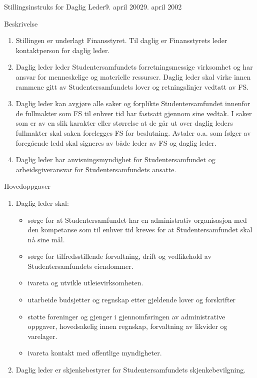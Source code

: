 \begin{instruks}{Stillingsinstruks for Daglig Leder}{9. april 2002}{9. april 2002}
    \begin{instruksledd}{Beskrivelse}
        \begin{enumerate}
            \item Stillingen er underlagt Finansstyret. Til daglig er Finansstyrets leder kontaktperson for daglig leder.
            \item Daglig leder leder Studentersamfundets forretningsmessige virksomhet og har ansvar for menneskelige og materielle
                ressurser. Daglig leder skal virke innen rammene gitt av Studentersamfundets lover og retningslinjer vedtatt av FS.
            \item Daglig leder kan avgjøre alle saker og forplikte Studentersamfundet innenfor de fullmakter som FS til enhver tid har
                fastsatt gjennom sine vedtak. I saker som er av en slik karakter eller størrelse at de går ut over daglig leders
                fullmakter skal saken forelegges FS for beslutning. Avtaler o.a. som følger av foregående ledd skal signeres
                av både leder av FS og daglig leder.
            \item Daglig leder har anvisningsmyndighet for Studentersamfundet og arbeidsgiveransvar for Studentersamfundets ansatte.
        \end{enumerate}
    \end{instruksledd}

    \begin{instruksledd}{Hovedoppgaver}
        \begin{enumerate}
            \item Daglig leder skal:
                \begin{itemize}
                    \item sørge for at Studentersamfundet har en administrativ organisasjon med den kompetanse som til
                        enhver tid kreves for at Studentersamfundet skal nå sine mål.
                    \item sørge for tilfredsstillende forvaltning, drift og vedlikehold av Studentersamfundets eiendommer.
                    \item ivareta og utvikle utleievirksomheten.
                    \item utarbeide budsjetter og regnskap etter gjeldende lover og forskrifter
                    \item støtte foreninger og gjenger i gjennomføringen av administrative oppgaver, hovedsakelig innen
                        regnskap, forvaltning av likvider og varelager.
                    \item ivareta kontakt med offentlige myndigheter.
                \end{itemize}
            \item Daglig leder er skjenkebestyrer for Studentersamfundets skjenkebevilgning.
        \end{enumerate}
    \end{instruksledd}


\end{instruks}
